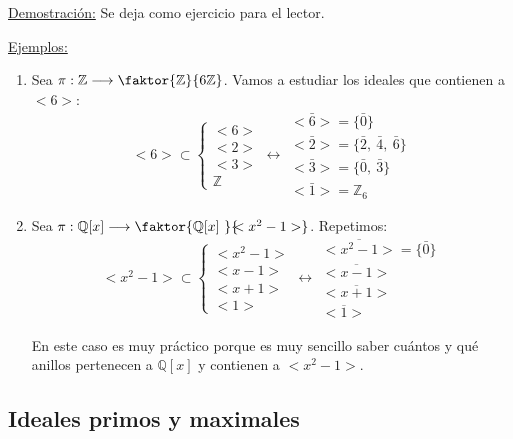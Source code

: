 \documentclass[10pt, a4paper]{article}
\newcommand{\Z}{\mathbb{Z}}
\newcommand{\Q}{\mathbb{Q}}
\newcommand{\ejs}{\underline{Ejemplos:} }
\newcommand{\demo}{\underline{Demostración:} }
\newenvironment{enumeratea}{\begin{enumerate}[label=\arabic*)]}
{\end{enumerate}}
\begin{document}
\demo Se deja como ejercicio para el lector.

\vspace{3mm}

\ejs
\begin{enumeratea}
	\item Sea $\pi : \Z \longrightarrow \faktor{\Z}{6\Z}$. Vamos a estudiar los ideales que contienen a $<6>$:
		\[
		<6> \subset \left \{
		\begin{array}{c}
			<6> \\
			<2> \\
			<3> \\
			\Z		
		\end{array}
		\right .
		\longleftrightarrow
		\begin{array}{l}
			<\bar{6}> = \{\bar{0}\} \\
			<\bar{2}> = \{\bar{2},\ \bar{4},\ \bar{6}\} \\
			<\bar{3}> = \{\bar{0},\ \bar{3}\} \\
			<\bar{1}> = \Z_6
		\end{array}
		\]
		\item Sea $\pi : \Q[x] \longrightarrow \faktor{\Q[x]\ }{\!\!<x^2 - 1>}$. Repetimos:
			\[
			<x^2 - 1> \subset \left \{
			\begin{array}{c}
				<x^2 - 1> \\
				<x - 1> \\
				<x + 1> \\
				<1>		
			\end{array}
			\right .
			\longleftrightarrow
			\begin{array}{l}
				<\overline{x^2 - 1}> = \{\bar{0}\} \\
				<\overline{x - 1}> \\
				<\overline{x + 1}> \\
				<\overline{1}>
			\end{array}
			\]

			En este caso es muy práctico porque es muy sencillo saber cuántos y qué anillos pertenecen a $\Q[x]$ y contienen a $<x^2 - 1>$.
\end{enumeratea}

\vspace{3mm}


\subsection{Ideales primos y maximales}

\vspace{3mm}
\end{document}
